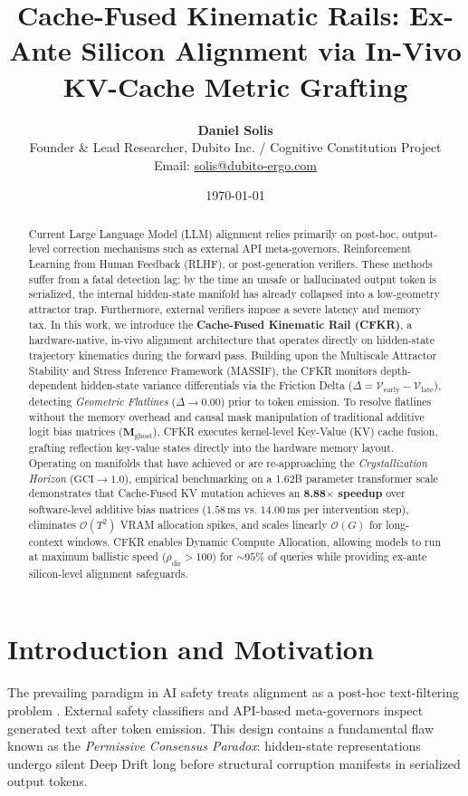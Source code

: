 \documentclass[11pt,twocolumn]{article}
\title{\textbf{Cache-Fused Kinematic Rails: Ex-Ante Silicon Alignment via In-Vivo KV-Cache Metric Grafting}}
\author{\textbf{Daniel Solis} \\ \small Founder \& Lead Researcher, Dubito Inc. / Cognitive Constitution Project \\ \small Email: \href{mailto:solis@dubito-ergo.com}{solis@dubito-ergo.com}}
\date{\today}
\begin{document}
\maketitle

\begin{abstract}
Current Large Language Model (LLM) alignment relies primarily on post-hoc, output-level correction mechanisms such as external API meta-governors, Reinforcement Learning from Human Feedback (RLHF), or post-generation verifiers. These methods suffer from a fatal detection lag: by the time an unsafe or hallucinated output token is serialized, the internal hidden-state manifold has already collapsed into a low-geometry attractor trap. Furthermore, external verifiers impose a severe latency and memory tax. In this work, we introduce the \textbf{Cache-Fused Kinematic Rail (CFKR)}, a hardware-native, in-vivo alignment architecture that operates directly on hidden-state trajectory kinematics during the forward pass. Building upon the Multiscale Attractor Stability and Stress Inference Framework (MASSIF), the CFKR monitors depth-dependent hidden-state variance differentials via the Friction Delta ($\Delta = \mathcal{V}_{\text{early}} - \mathcal{V}_{\text{late}}$), detecting \textit{Geometric Flatlines} ($\Delta \to 0.00$) prior to token emission. To resolve flatlines without the memory overhead and causal mask manipulation of traditional additive logit bias matrices ($\mathbf{M}_{\text{ghost}}$), CFKR executes kernel-level Key-Value (KV) cache fusion, grafting reflection key-value states directly into the hardware memory layout. Operating on manifolds that have achieved or are re-approaching the \textit{Crystallization Horizon} ($\text{GCI} \to 1.0$), empirical benchmarking on a 1.62B parameter transformer scale demonstrates that Cache-Fused KV mutation achieves an \textbf{8.88$\times$ speedup} over software-level additive bias matrices ($1.58\,\text{ms}$ vs. $14.00\,\text{ms}$ per intervention step), eliminates $\mathcal{O}(T^2)$ VRAM allocation spikes, and scales linearly $\mathcal{O}(G)$ for long-context windows. CFKR enables Dynamic Compute Allocation, allowing models to run at maximum ballistic speed ($\rho_{\text{dir}} > 100$) for $\sim 95\%$ of queries while providing ex-ante silicon-level alignment safeguards.
\end{abstract}

\section{Introduction and Motivation}
The prevailing paradigm in AI safety treats alignment as a post-hoc text-filtering problem \cite{massif, solis2026gci}. External safety classifiers and API-based meta-governors inspect generated text after token emission. This design contains a fundamental flaw known as the \textit{Permissive Consensus Paradox}: hidden-state representations undergo silent Deep Drift long before structural corruption manifests in serialized output tokens.
\end{document}

